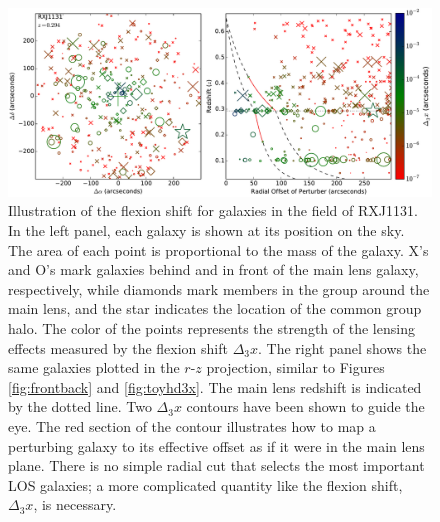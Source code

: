 \documentclass{emulateapj}
\begin{document}
\begin{figure}[t]
\begin{center}
\includegraphics[width=1\textwidth]{RXJ1131_fieldrz.pdf}
\caption{\label{fig:fieldrz} Illustration of the flexion shift for galaxies in the field of RXJ1131.  In the left panel, each galaxy is shown at its position on the sky.  The area of each point is proportional to the mass of the galaxy.  X's and O's mark galaxies behind and in front of the main lens galaxy, respectively, while diamonds mark members in the group around the main lens, and the star indicates the location of the common group halo.  The color of the points represents the strength of the lensing effects measured by the flexion shift $\Delta_3 x$. The right panel shows the same galaxies plotted in the $r$-$z$ projection, similar to Figures \ref{fig:frontback} and \ref{fig:toyhd3x}. The main lens redshift is indicated by the dotted line. Two $\Delta_3 x$ contours have been shown to guide the eye. The red section of the contour illustrates how to map a perturbing galaxy to its effective offset as if it were in the main lens plane. There is no simple radial cut that selects the most important LOS galaxies; a more complicated quantity like the flexion shift, $\Delta_3 x$, is necessary.%
}
\end{center}
\end{figure}
\end{document}
